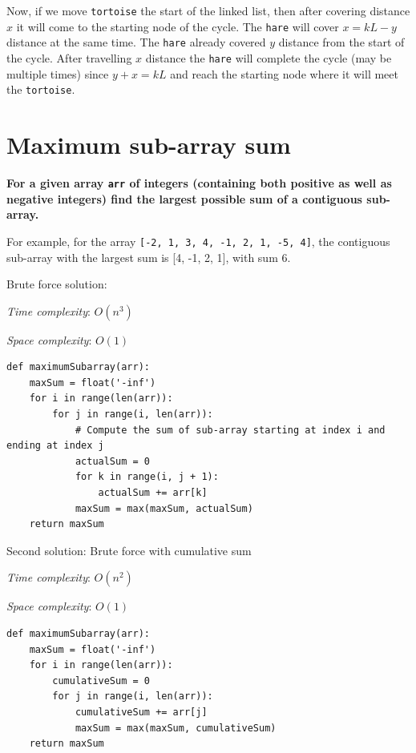 \documentclass[a4paper,11pt]{book}
\begin{document}
\noindent Now, if we move \lstinline{tortoise} the start of the linked list, then after covering distance $x$ it will come to the starting node of the cycle. The \lstinline{hare} will cover $x = k L-y$ distance at the same time. The \lstinline{hare} already covered $y$ distance from the start of the cycle. After travelling $x$ distance the \lstinline{hare} will complete the cycle (may be multiple times) since $y+x=k L$ and reach the starting node where it will meet the \lstinline{tortoise}.

\newpage
\section{Maximum sub-array sum}

\noindent \textbf{For a given array \lstinline{arr} of integers (containing both positive as well as negative integers) find the largest possible sum of a contiguous sub-array.}
\vspace{5mm}

\noindent For example, for the array \lstinline{[-2, 1, 3, 4, -1, 2, 1, -5, 4]}, the contiguous sub-array with the largest sum is [4, -1, 2, 1], with sum 6.
\vspace{5mm}

\noindent Brute force solution:

\noindent \textit{Time complexity}: $O(n^3)$

\noindent \textit{Space complexity}: $O(1)$

\begin{lstlisting}
def maximumSubarray(arr):
    maxSum = float('-inf')
    for i in range(len(arr)):
        for j in range(i, len(arr)):
            # Compute the sum of sub-array starting at index i and ending at index j
            actualSum = 0
            for k in range(i, j + 1):
                actualSum += arr[k]
            maxSum = max(maxSum, actualSum)
    return maxSum
\end{lstlisting}

\noindent Second solution: Brute force with cumulative sum

\noindent \textit{Time complexity}: $O(n^2)$

\noindent \textit{Space complexity}: $O(1)$

\begin{lstlisting}
def maximumSubarray(arr):
    maxSum = float('-inf')
    for i in range(len(arr)):
        cumulativeSum = 0
        for j in range(i, len(arr)):
            cumulativeSum += arr[j]
            maxSum = max(maxSum, cumulativeSum)
    return maxSum
\end{lstlisting}
\end{document}
